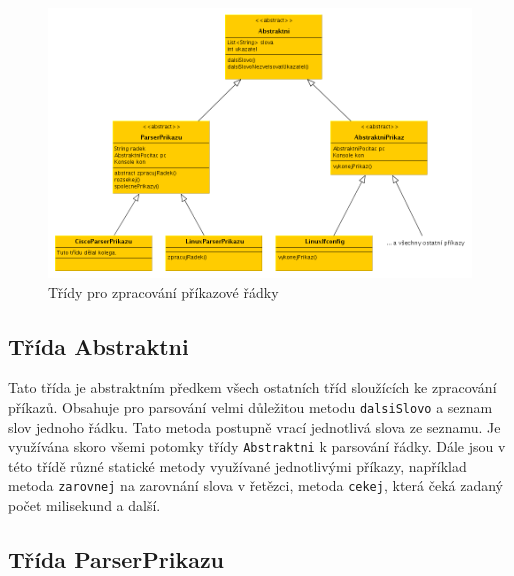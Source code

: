\begin{figure}[h]
\begin{center}
\includegraphics[width=14cm]{obrazky/prikazy}
\caption{Třídy pro zpracování příkazové řádky}
\label{obr_prikazy}
\end{center}
\end{figure}


\subsection{Třída Abstraktni}

Tato třída je abstraktním předkem všech ostatních tříd sloužících ke zpracování příkazů. Obsahuje pro parsování velmi důležitou metodu \verb|dalsiSlovo| a seznam slov jednoho řádku. Tato metoda postupně vrací jednotlivá slova ze seznamu. Je využívána skoro všemi potomky třídy \verb|Abstraktni| k parsování řádky. Dále jsou v této třídě různé statické metody využívané jednotlivými příkazy, například metoda \verb|zarovnej| na zarovnání slova v řetězci, metoda \verb|cekej|, která čeká zadaný počet milisekund a další.


\subsection{Třída ParserPrikazu}

